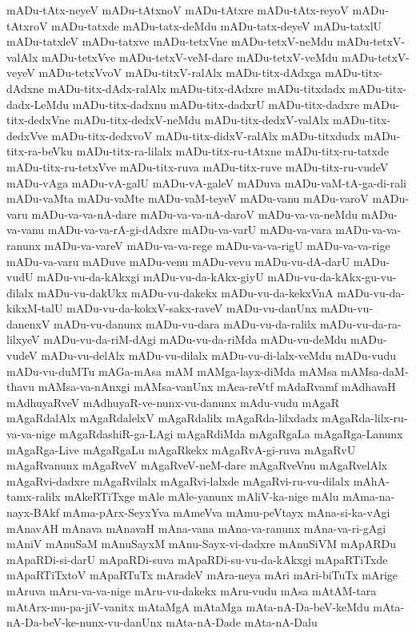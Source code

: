 {mADu-tAtx-neyeV
mADu-tAtxnoV
mADu-tAtxre
mADu-tAtx-reyoV
mADu-tAtxroV
mADu-tatxde
mADu-tatx-deMdu
mADu-tatx-deyeV
mADu-tatxlU
mADu-tatxleV
mADu-tatxve
mADu-tetxVne
mADu-tetxV-neMdu
mADu-tetxV-valAlx
mADu-tetxVve
mADu-tetxV-veM-dare
mADu-tetxV-veMdu
mADu-tetxV-veyeV
mADu-tetxVvoV
mADu-titxV-ralAlx
mADu-titx-dAdxga
mADu-titx-dAdxne
mADu-titx-dAdx-ralAlx
mADu-titx-dAdxre
mADu-titxdadx
mADu-titx-dadx-LeMdu
mADu-titx-dadxnu
mADu-titx-dadxrU
mADu-titx-dadxre
mADu-titx-dedxVne
mADu-titx-dedxV-neMdu
mADu-titx-dedxV-valAlx
mADu-titx-dedxVve
mADu-titx-dedxvoV
mADu-titx-didxV-ralAlx
mADu-titxdudx
mADu-titx-ra-beVku
mADu-titx-ra-lilalx
mADu-titx-ru-tAtxne
mADu-titx-ru-tatxde
mADu-titx-ru-tetxVve
mADu-titx-ruva
mADu-titx-ruve
mADu-titx-ru-vudeV
mADu-vAga
mADu-vA-galU
mADu-vA-galeV
mADuva
mADu-vaM-tA-ga-di-rali
mADu-vaMta
mADu-vaMte
mADu-vaM-teyeV
mADu-vanu
mADu-varoV
mADu-varu
mADu-va-va-nA-dare
mADu-va-va-nA-daroV
mADu-va-va-neMdu
mADu-va-vanu
mADu-va-va-rA-gi-dAdxre
mADu-va-varU
mADu-va-vara
mADu-va-va-ranunx
mADu-va-vareV
mADu-va-va-rege
mADu-va-va-rigU
mADu-va-va-rige
mADu-va-varu
mADuve
mADu-venu
mADu-vevu
mADu-vu-dA-darU
mADu-vudU
mADu-vu-da-kAkxgi
mADu-vu-da-kAkx-giyU
mADu-vu-da-kAkx-gu-vu-dilalx
mADu-vu-dakUkx
mADu-vu-dakekx
mADu-vu-da-kekxVnA
mADu-vu-da-kikxM-talU
mADu-vu-da-kokxV-sakx-raveV
mADu-vu-danUnx
mADu-vu-danenxV
mADu-vu-danunx
mADu-vu-dara
mADu-vu-da-ralilx
mADu-vu-da-ra-lilxyeV
mADu-vu-da-riM-dAgi
mADu-vu-da-riMda
mADu-vu-deMdu
mADu-vudeV
mADu-vu-delAlx
mADu-vu-dilalx
mADu-vu-di-lalx-veMdu
mADu-vudu
mADu-vu-duMTu
mAGa-mAsa
mAM
mAMga-layx-diMda
mAMsa
mAMsa-daM-thavu
mAMsa-va-nAnxgi
mAMsa-vanUnx
mAca-reVtf
mAdaRvamf
mAdhavaH
mAdhuyaRveV
mAdhuyaR-ve-nunx-vu-danunx
mAdu-vudu
mAgaR
mAgaRdalAlx
mAgaRdalelxV
mAgaRdalilx
mAgaRda-lilxdadx
mAgaRda-lilx-ru-va-va-nige
mAgaRdashiR-ga-LAgi
mAgaRdiMda
mAgaRgaLa
mAgaRga-Lanunx
mAgaRga-Live
mAgaRgaLu
mAgaRkekx
mAgaRvA-gi-ruva
mAgaRvU
mAgaRvanunx
mAgaRveV
mAgaRveV-neM-dare
mAgaRveVnu
mAgaRvelAlx
mAgaRvi-dadxre
mAgaRvilalx
mAgaRvi-lalxde
mAgaRvi-ru-vu-dilalx
mAhA-tamx-ralilx
mAkeRTiTxge
mAle
mAle-yanunx
mAliV-ka-nige
mAlu
mAma-na-nayx-BAkf
mAma-pArx-SeyxYva
mAmeVva
mAmu-peVtayx
mAna-si-ka-vAgi
mAnavAH
mAnava
mAnavaH
mAna-vana
mAna-va-ranunx
mAna-va-ri-gAgi
mAniV
mAnuSaM
mAnuSayxM
mAnu-Sayx-vi-dadxre
mAnuSiVM
mApARDu
mApaRDi-si-darU
mApaRDi-suva
mApaRDi-su-vu-da-kAkxgi
mApaRTiTxde
mApaRTiTxtoV
mApaRTuTx
mAradeV
mAra-neya
mAri
mAri-biTuTx
mArige
mAruva
mAru-va-va-nige
mAru-vu-dakekx
mAru-vudu
mAsa
mAtAM-tara
mAtArx-mu-pa-jiV-vanitx
mAtaMgA
mAtaMga
mAta-nA-Da-beV-keMdu
mAta-nA-Da-beV-ke-nunx-vu-danUnx
mAta-nA-Dade
mAta-nA-Dalu
}
